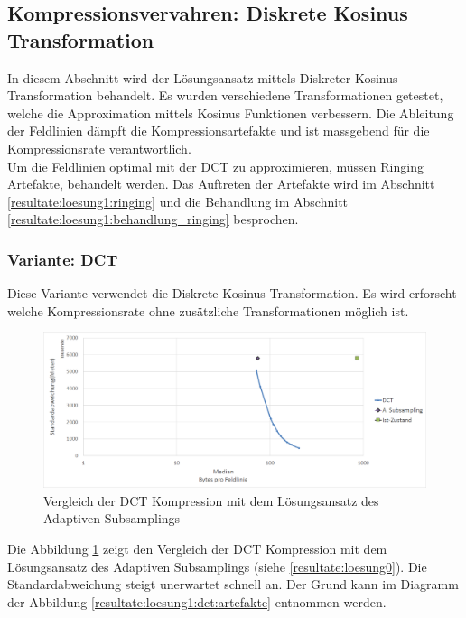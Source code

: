 \subsection{Kompressionsvervahren: Diskrete Kosinus Transformation} \label{resultate:loesung1}
In diesem Abschnitt wird der Lösungsansatz mittels Diskreter Kosinus Transformation behandelt. Es wurden verschiedene Transformationen getestet, welche die Approximation mittels Kosinus Funktionen verbessern. Die Ableitung der Feldlinien dämpft die Kompressionsartefakte und ist massgebend für die Kompressionsrate verantwortlich.\\
Um die Feldlinien optimal mit der DCT zu approximieren, müssen Ringing Artefakte, behandelt werden. Das Auftreten der Artefakte wird im Abschnitt \ref{resultate:loesung1:ringing} und die Behandlung im Abschnitt \ref{resultate:loesung1:behandlung_ringing} besprochen.

\subsubsection{Variante: DCT}\label{resultate:dct}
Diese Variante verwendet die Diskrete Kosinus Transformation. Es wird erforscht welche Kompressionsrate ohne zusätzliche Transformationen möglich ist.

\begin{figure}[!htbp]
	\center
	\includegraphics[width=1\textwidth,keepaspectratio]{./pictures/resultate/loesung1/loesung1-0/loesung1_0.png}
	\caption{Vergleich der DCT Kompression mit dem Lösungsansatz des Adaptiven Subsamplings}
	\label{resultate:loesung1:dct:resultate}
\end{figure}
Die Abbildung \ref{resultate:loesung1:dct:resultate} zeigt den Vergleich der DCT Kompression mit dem Lösungsansatz des Adaptiven Subsamplings (siehe \ref{resultate:loesung0}). Die Standardabweichung steigt unerwartet schnell an. Der Grund kann im Diagramm der Abbildung \ref{resultate:loesung1:dct:artefakte} entnommen werden. 

